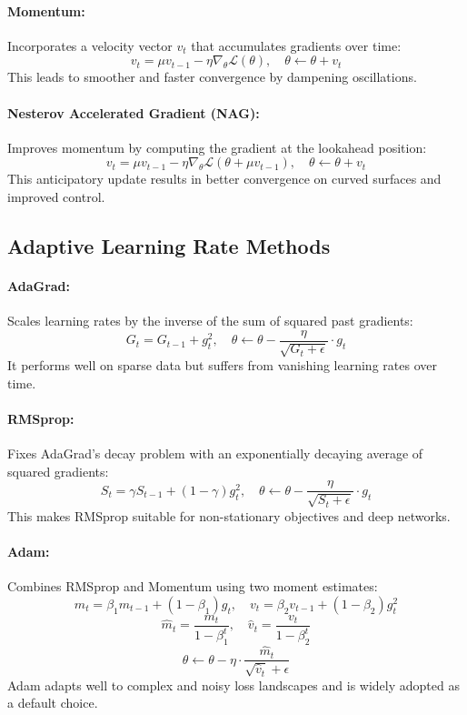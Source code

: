 \documentclass[12pt]{article}
\begin{document}
\paragraph{Momentum:}  
Incorporates a velocity vector $v_t$ that accumulates gradients over time:
\[
v_t = \mu v_{t-1} - \eta \nabla_{\theta} \mathcal{L}(\theta), \quad \theta \leftarrow \theta + v_t
\]
This leads to smoother and faster convergence by dampening oscillations.

\paragraph{Nesterov Accelerated Gradient (NAG):}  
Improves momentum by computing the gradient at the lookahead position:
\[
v_t = \mu v_{t-1} - \eta \nabla_{\theta} \mathcal{L}(\theta + \mu v_{t-1}), \quad \theta \leftarrow \theta + v_t
\]
This anticipatory update results in better convergence on curved surfaces and improved control.

\subsection{Adaptive Learning Rate Methods}

\paragraph{AdaGrad:}  
Scales learning rates by the inverse of the sum of squared past gradients:
\[
G_t = G_{t-1} + g_t^2, \quad \theta \leftarrow \theta - \frac{\eta}{\sqrt{G_t + \epsilon}} \cdot g_t
\]
It performs well on sparse data but suffers from vanishing learning rates over time.

\paragraph{RMSprop:}  
Fixes AdaGrad’s decay problem with an exponentially decaying average of squared gradients:
\[
S_t = \gamma S_{t-1} + (1 - \gamma) g_t^2, \quad \theta \leftarrow \theta - \frac{\eta}{\sqrt{S_t + \epsilon}} \cdot g_t
\]
This makes RMSprop suitable for non-stationary objectives and deep networks.

\paragraph{Adam:}  
Combines RMSprop and Momentum using two moment estimates:
\[
m_t = \beta_1 m_{t-1} + (1 - \beta_1) g_t, \quad v_t = \beta_2 v_{t-1} + (1 - \beta_2) g_t^2
\]
\[
\hat{m}_t = \frac{m_t}{1 - \beta_1^t}, \quad \hat{v}_t = \frac{v_t}{1 - \beta_2^t}
\]
\[
\theta \leftarrow \theta - \eta \cdot \frac{\hat{m}_t}{\sqrt{\hat{v}_t} + \epsilon}
\]
Adam adapts well to complex and noisy loss landscapes and is widely adopted as a default choice.
\end{document}
